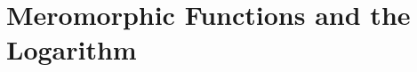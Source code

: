 \documentclass[../../main.tex]{subfiles}
\begin{document}
\chapter{Meromorphic Functions and the Logarithm}
\end{document}
